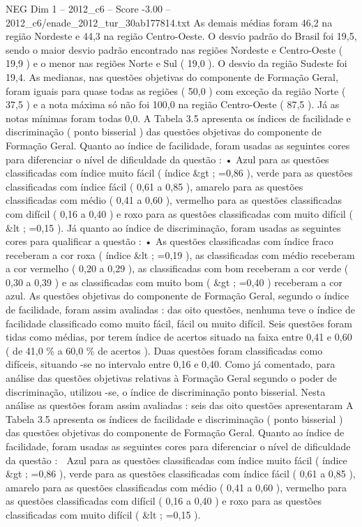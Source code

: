 \begin{textsample}{NEG Dim 1 – 2012\_c6 – Score -3.00 – 2012\_c6/enade\_2012\_tur\_30ab177814.txt}
As demais médias foram 46,2 na região Nordeste e 44,3 na região Centro-Oeste.
O desvio padrão do Brasil foi 19,5, sendo o maior desvio padrão encontrado nas regiões Nordeste e Centro-Oeste ( 19,9 ) e o menor nas regiões Norte e Sul ( 19,0 ).
O desvio da região Sudeste foi 19,4.
As medianas, nas questões objetivas do componente de Formação Geral, foram iguais para quase todas as regiões ( 50,0 ) com exceção da região Norte ( 37,5 ) e a nota máxima só não foi 100,0 na região Centro-Oeste ( 87,5 ).
Já as notas mínimas foram todas 0,0.
A Tabela 3.5 apresenta os índices de facilidade e discriminação ( ponto bisserial ) das questões objetivas do componente de Formação Geral.
Quanto ao índice de facilidade, foram usadas as seguintes cores para diferenciar o nível de dificuldade da questão : • Azul para as questões classificadas com índice muito fácil ( índice \&gt ; =0,86 ), verde para as questões classificadas com índice fácil ( 0,61 a 0,85 ), amarelo para as questões classificadas com médio ( 0,41 a 0,60 ), vermelho para as questões classificadas com difícil ( 0,16 a 0,40 ) e roxo para as questões classificadas com muito difícil ( \&lt ; =0,15 ).
Já quanto ao índice de discriminação, foram usadas as seguintes cores para qualificar a questão : • As questões classificadas com índice fraco receberam a cor roxa ( índice \&lt ; =0,19 ), as classificadas com médio receberam a cor vermelho ( 0,20 a 0,29 ), as classificadas com bom receberam a cor verde ( 0,30 a 0,39 ) e as classificadas com muito bom ( \&gt ; =0,40 ) receberam a cor azul.
As questões objetivas do componente de Formação Geral, segundo o índice de facilidade, foram assim avaliadas : das oito questões, nenhuma teve o índice de facilidade classificado como muito fácil, fácil ou muito difícil.
Seis questões foram tidas como médias, por terem índice de acertos situado na faixa entre 0,41 e 0,60 ( de 41,0 \% a 60,0 \% de acertos ).
Duas questões foram classificadas como difíceis, situando -se no intervalo entre 0,16 e 0,40.
Como já comentado, para análise das questões objetivas relativas à Formação Geral segundo o poder de discriminação, utilizou -se, o índice de discriminação ponto bisserial.
Nesta análise as questões foram assim avaliadas : seis das oito questões apresentaram A Tabela 3.5 apresenta os índices de facilidade e discriminação ( ponto bisserial ) das questões objetivas do componente de Formação Geral.
Quanto ao índice de facilidade, foram usadas as seguintes cores para diferenciar o nível de dificuldade da questão :  Azul para as questões classificadas com índice muito fácil ( índice \&gt ; =0,86 ), verde para as questões classificadas com índice fácil ( 0,61 a 0,85 ), amarelo para as questões classificadas com médio ( 0,41 a 0,60 ), vermelho para as questões classificadas com difícil ( 0,16 a 0,40 ) e roxo para as questões classificadas com muito difícil ( \&lt ; =0,15 ).

\end{textsample}
